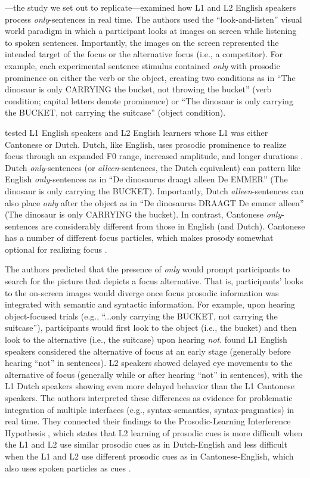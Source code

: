 \textcite{ge2021a}---the study we set out to replicate---examined how L1 and L2 English speakers process \textit{only}-sentences in real time. The authors used the “look-and-listen” visual world paradigm in which a participant looks at images on screen while listening to spoken sentences. Importantly, the images on the screen represented the intended target of the focus or the alternative focus (i.e., a competitor). For example, each experimental sentence stimulus contained \textit{only} with prosodic prominence on either the verb or the object, creating two conditions as in “The dinosaur is only CARRYING the bucket, not throwing the bucket” (verb condition; capital letters denote prominence) or “The dinosaur is only carrying the BUCKET, not carrying the suitcase” (object condition).

\textcite{ge2021a} tested L1 English speakers and L2 English learners whose L1 was either Cantonese or Dutch. Dutch, like English, uses prosodic prominence to realize focus through an expanded F0 range, increased amplitude, and longer durations \parencite{dimitrova2010focus}. Dutch \textit{only}-sentences (or \textit{alleen}-sentences, the Dutch equivalent) can pattern like English \textit{only}-sentences as in “De dinosaurus draagt alleen De EMMER” (The dinosaur is only carrying the BUCKET). Importantly, Dutch \textit{alleen}-sentences can also place \textit{only} after the object as in “De dinosaurus DRAAGT De emmer alleen” (The dinosaur is only CARRYING the bucket). In contrast, Cantonese \textit{only}-sentences are considerably different from those in English (and Dutch). Cantonese has a number of different focus particles, which makes prosody somewhat optional for realizing focus \parencite{lee2019focus, wu2010prosodic, ge2024bilingual, fung2000final}. 

The authors predicted that the presence of \textit{only} would prompt participants to search for the picture that depicts a focus alternative. That is, participants' looks to the on-screen images would diverge once focus prosodic information was integrated with semantic and syntactic information. For example, upon hearing object-focused trials (e.g., “...only carrying the BUCKET, not carrying the suitcase”), participants would first look to the object (i.e., the bucket) and then look to the alternative (i.e., the suitcase) upon hearing \textit{not}. \textcite{ge2021a} found L1 English speakers considered the alternative of focus at an early stage (generally before hearing “not” in sentences). L2 speakers showed delayed eye movements to the alternative of focus (generally while or after hearing “not” in sentences), with the L1 Dutch speakers showing even more delayed behavior than the L1 Cantonese speakers. The authors interpreted these differences as evidence for problematic integration of multiple interfaces (e.g., syntax-semantics, syntax-pragmatics) in real time. They connected their findings to the Prosodic-Learning Interference Hypothesis \parencite{tremblay2016effects, tremblay2021re}, which states that L2 learning of prosodic cues is more difficult when the L1 and L2 use similar prosodic cues as in Dutch-English and less difficult when the L1 and L2 use different prosodic cues as in Cantonese-English, which also uses spoken particles as cues \parencite[see also][]{ge2021b}. 

